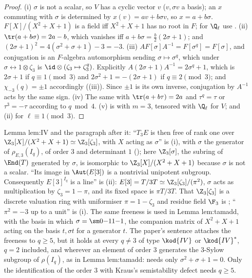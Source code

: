 \begin{proof}
(i) $\sigma$ is not a scalar, so $V$ has a cyclic vector $v$ ($v,\sigma v$ a basis); an $x$ commuting with $\sigma$ is determined by $x(v)=av+b\sigma v$, so
$x=a+b\sigma$. $F[X]/(X^2+X+1)$ is a field iff $X^2+X+1$ has no root in $F$; for $\Q_\ell$ use . (ii) $\tr(a+b\sigma)=2a-b$, which vanishes
iff $a+b\sigma=\frac b2(2\sigma+1)$; and $(2\sigma+1)^2=4(\sigma^2+\sigma+1)-3=-3$. (iii) $A F[\sigma]A^{-1}=F[\sigma^q]=F[\sigma]$, and conjugation is an
$F$-algebra automorphism sending $\sigma\mapsto\sigma^q$, which under $\sigma\leftrightarrow1\otimes\zeta_3$ is $\id\otimes(\zeta_3\mapsto\zeta_3^q)$. Explicitly
$A(2\sigma+1)A^{-1}=2\sigma^q+1$, which is $2\sigma+1$ if $q\equiv1\pmod3$ and $2\sigma^2+1=-(2\sigma+1)$ if $q\equiv2\pmod 3$; and $\chi_{-3}(q)=\pm1$
accordingly ((iii)). Since $\pm1$ is its own inverse, conjugation by $A^{-1}$ acts by the same sign. (iv) The same with $\tr(a+b\tau)=2a$ and
$\tau^q=\tau$ or $\tau^3=-\tau$ according to $q\bmod4$. (v) is  with $m=3$, tensored with $\Q_\ell$ for $V$; and
(ii) for $\ell\equiv1\pmod3$.
\end{proof}

\begin{paperlink}\label{pl:ant:IV}
Lemma lem:IV and the paragraph after it: ``$T_3E$ is then free of rank one over $\Z_3[X]/(X^2+X+1)\simeq\Z_3[\zeta_3]$, with $X$ acting as $\sigma$'' is
(i), with $\sigma$ the generator of $\rho_{E,3}(I_q)$, of order $3$ and determinant $1$ (); here $\Z_3[\sigma]$, the
subring of $\End(T)$ generated by $\sigma$, is isomorphic to $\Z_3[X]/(X^2+X+1)$ because $\sigma$ is not a scalar. ``Its image in $\Aut(E[3])$ is a nontrivial
unipotent subgroup. Consequently $E[3]^{I_q}$ is a line'' is (ii): $E[3]=T/3T\simeq\Z_3[\zeta_3]/(\pi^2)$, $\sigma$ acts as
multiplication by $\zeta_3=1-\pi$, and its fixed space is $\pi T/3T$. That $\Z_3[\zeta_3]$ is a discrete valuation ring with uniformiser $\pi=1-\zeta_3$ and
residue field $\F_3$ is ; ``$\pi^2=-3$ up to a unit'' is (i). The same freeness is used in Lemma lem:tamadd,
with the basis in which $\sigma=\sm0{-1}1{-1}$, the companion matrix of $X^2+X+1$ acting on the basis $t,\sigma t$ for a generator $t$.
The paper's sentence attaches the freeness to $q\ge5$, but it holds at every $q\ne3$ of type $\kod{IV}$ or $\kod{IV}^*$, $q=2$ included, and wherever an element of
order $3$ generates the $3$-Sylow subgroup of $\rho(I_q)$, as in Lemma lem:tamadd:  needs only $\sigma^2+\sigma+1=0$. Only the
identification of the order $3$ with Kraus's semistability defect needs $q\ge5$.
\end{paperlink}

